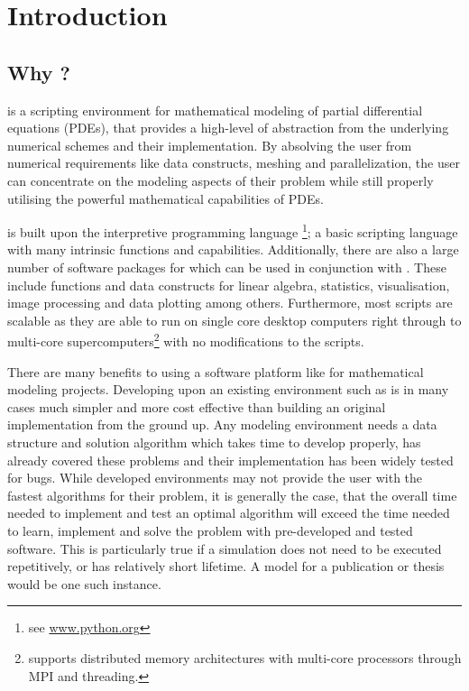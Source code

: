 
%
%
%

\chapter{Introduction}
\label{CHAP INTRO}
\section{Why \esc?}
\esc is a scripting environment for mathematical modeling of partial differential equations (PDEs), that provides a high-level of abstraction from the underlying numerical schemes and their implementation. By absolving the user from numerical requirements like data constructs, meshing and parallelization, the user can concentrate on the modeling aspects of their problem while still properly utilising the powerful mathematical capabilities of PDEs. 

\esc is built upon the interpretive programming language \pyt\footnote{see \url{www.python.org}}; a basic scripting language with many intrinsic functions and capabilities. Additionally, there are also a large number of software packages for \pyt which can be used in conjunction with \esc. These include functions and data constructs for linear algebra, statistics, visualisation, image processing and data plotting among others. Furthermore, most \esc scripts are scalable as they are able to run on single core desktop computers right through to multi-core supercomputers\footnote{\esc supports distributed memory architectures with multi-core processors through MPI and threading.} with no modifications to the scripts. 

There are many benefits to using a software platform like \esc for mathematical modeling projects. Developing upon an existing environment such as \esc is in many cases much simpler and more cost effective than building an original implementation from the ground up. Any modeling environment needs a data structure and solution algorithm which takes time to develop properly, \esc has already covered these problems and their implementation has been widely tested for bugs. While developed environments may not provide the user with the fastest algorithms for their problem, it is generally the case, that the overall time needed to implement and test an optimal algorithm will exceed the time needed to learn, implement and solve the problem with pre-developed and tested software. This is particularly true if a simulation does not need to be executed repetitively, or has relatively short lifetime. A model for a publication or thesis would be one such instance. 

